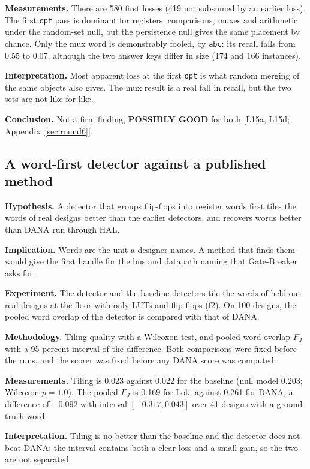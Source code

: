 \documentclass[conference]{IEEEtran}
\newcommand{\verdict}[1]{\textbf{\textsc{#1}}}
\newcommand{\hev}[1]{\par\smallskip\noindent\textbf{#1}}
\newcommand{\code}[1]{\texttt{#1}}
\begin{document}
\hev{Measurements.} There are 580 first losses (419 not subsumed by an earlier loss). The first \code{opt} pass is dominant for registers, comparisons, muxes and arithmetic under the random-set null, but the persistence null gives the same placement by chance. Only the mux word is demonstrably fooled, by \code{abc}: its recall falls from 0.55 to 0.07, although the two answer keys differ in size (174 and 166 instances).

\hev{Interpretation.} Most apparent loss at the first \code{opt} is what random merging of the same objects also gives. The mux result is a real fall in recall, but the two sets are not like for like.

\hev{Conclusion.} Not a firm finding, \verdict{POSSIBLY GOOD} for both [L15a, L15d; Appendix~\ref{sec:round6}].

\subsection{A word-first detector against a published method}
\label{arg:ra7}

\hev{Hypothesis.} A detector that groups flip-flops into register words first tiles the words of real designs better than the earlier detectors, and recovers words better than DANA run through HAL.

\hev{Implication.} Words are the unit a designer names. A method that finds them would give the first handle for the bus and datapath naming that Gate-Breaker asks for.

\hev{Experiment.} The detector and the baseline detectors tile the words of held-out real designs at the floor with only LUTs and flip-flops (f2). On 100 designs, the pooled word overlap of the detector is compared with that of DANA.

\hev{Methodology.} Tiling quality with a Wilcoxon test, and pooled word overlap $F_J$ with a 95 percent interval of the difference. Both comparisons were fixed before the runs, and the scorer was fixed before any DANA score was computed.

\hev{Measurements.} Tiling is 0.023 against 0.022 for the baseline (null model 0.203; Wilcoxon $p=1.0$). The pooled $F_J$ is 0.169 for Loki against 0.261 for DANA, a difference of $-0.092$ with interval $[-0.317, 0.043]$ over 41 designs with a ground-truth word.

\hev{Interpretation.} Tiling is no better than the baseline and the detector does not beat DANA; the interval contains both a clear loss and a small gain, so the two are not separated.
\end{document}
